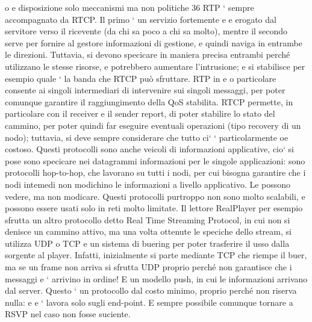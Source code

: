 \documentclass[a4paper,12pt]{article}
\begin{document}
o
e
disposizione solo meccanismi ma non politiche
36
RTP ` sempre accompagnato da RTCP. Il primo ` un servizio fortemente
e
e
erogato dal servitore verso il ricevente (da chi sa poco a chi sa molto), mentre
il secondo serve per fornire al gestore informazioni di gestione, e quindi naviga
in entrambe le direzioni. Tuttavia, si devono specicare in maniera precisa entrambi perché utilizzano le stesse risorse,
e potrebbero aumentare l'intrusione;
e
si stabilisce per esempio quale ` la banda che RTCP può sfruttare. RTP in
e
o
particolare consente ai singoli intermediari di intervenire sui singoli messaggi,
per poter comunque garantire il raggiungimento della QoS stabilita. RTCP permette, in particolare con il receiver e il
sender report, di poter stabilire lo stato
del cammino, per poter quindi far eseguire eventuali operazioni (tipo recovery
di un nodo); tuttavia, si deve sempre considerare che tutto ci` ` particolarmente
oe
costoso.
Questi protocolli sono anche veicoli di informazioni applicative, cio` si pose
sono specicare nei datagrammi informazioni per le singole applicazioni: sono
protocolli hop-to-hop, che lavorano su tutti i nodi, per cui bisogna garantire che
i nodi intemedi non modichino le informazioni a livello applicativo. Le possono
vedere, ma non modicare.
Questi protocolli purtroppo non sono molto scalabili, e possono essere usati
solo in reti molto limitate. Il lettore RealPlayer per esempio sfrutta un altro
protocollo detto Real Time Streaming Protocol, in cui non si denisce un cammino attivo, ma una volta ottenute le
speciche dello stream, si utilizza UDP
o TCP e un sistema di buering per poter trasferire il usso dalla sorgente al
player. Infatti, inizialmente si parte mediante TCP che riempe il buer, ma se
un frame non arriva si sfrutta UDP proprio perché non garantisce che i messaggi
e
`
arrivino in ordine! E un modello push, in cui le informazioni arrivano dal server. Questo ` un protocollo dal costo
minimo, proprio perché non riserva nulla:
e
e
`
lavora solo sugli end-point. E sempre possibile comunque tornare a RSVP nel
caso non fosse suciente.
\end{document}

